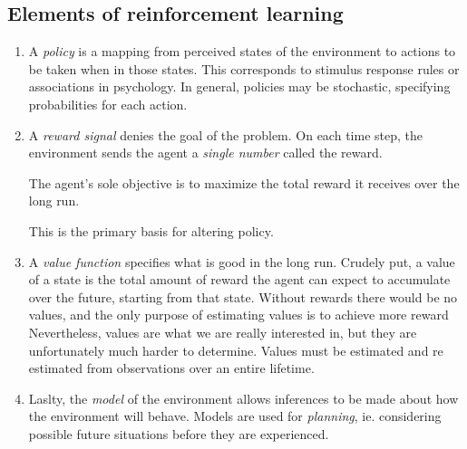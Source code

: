 \subsection
{Elements of reinforcement learning}
\begin{enumerate}
    \item A \textit{policy} is a mapping from perceived states of the environment to actions to be taken when in those states. This corresponds to stimulus response rules or associations in psychology. In general, policies may be stochastic, specifying probabilities for each action.
    \item A \textit{reward signal} denies the goal of the problem. On each time step, the environment sends the agent a \textit{single number} called the reward.
        \begin{center}
            The agent's sole objective is to maximize the total reward it receives over the long run.
        \end{center}
        This is the primary basis for altering policy.
    \item A \textit{value function} specifies what is good in the long run. Crudely put, a value of a state is the total amount of reward the agent can expect to accumulate over the future, starting from that state. Without rewards there would be no values, and the only purpose of estimating values is to achieve more reward Nevertheless, values are what we are really interested in, but they are unfortunately much harder to determine. Values must be estimated and re estimated from observations over an entire lifetime.
    \item Laslty, the \textit{model} of the environment allows inferences to be made about how the environment will behave. Models are used for \textit{planning}, ie. considering possible future situations before they are experienced.
\end{enumerate}
